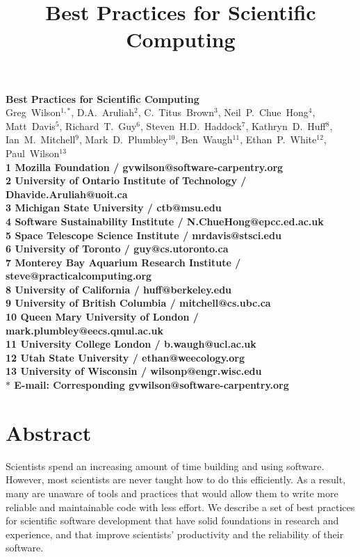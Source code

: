 \documentclass[10pt]{article}
\date{}
\begin{document}
\begin{flushleft}
{\Large
\textbf{Best Practices for Scientific Computing}
}
\\
{Greg~Wilson}$^{1,\ast}$,
{D.A.~Aruliah}$^{2}$,
{C.~Titus~Brown}$^{3}$,
{Neil~P.~Chue~Hong}$^{4}$,
{Matt~Davis}$^{5}$,
{Richard~T.~Guy}$^{6}$,
{Steven~H.D.~Haddock}$^{7}$,
{Kathryn~D.~Huff}$^{8}$,
{Ian~M.~Mitchell}$^{9}$,
{Mark~D.~Plumbley}$^{10}$,
{Ben~Waugh}$^{11}$,
{Ethan~P.~White}$^{12}$,
{Paul~Wilson}$^{13}$
\\
\bf{1} Mozilla Foundation / gvwilson@software-carpentry.org
\\
\bf{2} University of Ontario Institute of Technology / Dhavide.Aruliah@uoit.ca
\\
\bf{3} Michigan State University / ctb@msu.edu
\\
\bf{4} Software Sustainability Institute / N.ChueHong@epcc.ed.ac.uk
\\
\bf{5} Space Telescope Science Institute / mrdavis@stsci.edu
\\
\bf{6} University of  Toronto / guy@cs.utoronto.ca
\\
\bf{7} Monterey Bay Aquarium Research Institute / steve@practicalcomputing.org
\\
\bf{8} University of  California / huff@berkeley.edu
\\
\bf{9} University of British Columbia / mitchell@cs.ubc.ca
\\
\bf{10} Queen Mary University of London  / mark.plumbley@eecs.qmul.ac.uk
\\
\bf{11} University College London / b.waugh@ucl.ac.uk
\\
\bf{12} Utah State University  / ethan@weecology.org
\\
\bf{13} University of  Wisconsin / wilsonp@engr.wisc.edu
\\
$\ast$ E-mail: Corresponding gvwilson@software-carpentry.org
\end{flushleft}

\title{Best Practices for Scientific Computing}

\section*{Abstract}

Scientists spend an increasing amount of time building and using
software. However, most scientists are never taught how to do this
efficiently. As a result, many are unaware of tools and practices that
would allow them to write more reliable and maintainable code with
less effort. We describe a set of best practices for scientific
software development that have solid foundations in research and
experience, and that improve scientists' productivity and the
reliability of their software.
\end{document}

